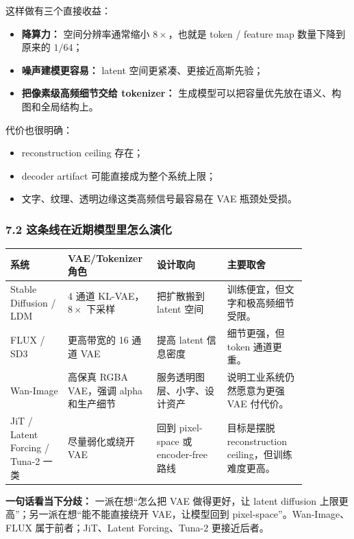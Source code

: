 这样做有三个直接收益：

\begin{itemize}[leftmargin=1.5em]
  \item \textbf{降算力：} 空间分辨率通常缩小 $8\times$，也就是 token / feature map 数量下降到原来的 $1/64$；
  \item \textbf{噪声建模更容易：} latent 空间更紧凑、更接近高斯先验；
  \item \textbf{把像素级高频细节交给 tokenizer：} 生成模型可以把容量优先放在语义、构图和全局结构上。
\end{itemize}

代价也很明确：

\begin{itemize}[leftmargin=1.5em]
  \item reconstruction ceiling 存在；
  \item decoder artifact 可能直接成为整个系统上限；
  \item 文字、纹理、透明边缘这类高频信号最容易在 VAE 瓶颈处受损。
\end{itemize}

\subsubsection{7.2 这条线在近期模型里怎么演化}

\begin{center}
\footnotesize
\setlength{\tabcolsep}{4pt}
\begin{tabular}{p{0.18\linewidth} p{0.21\linewidth} p{0.22\linewidth} p{0.25\linewidth}}
\toprule
\textbf{系统} & \textbf{VAE/Tokenizer 角色} & \textbf{设计取向} & \textbf{主要取舍}\\
\midrule
Stable Diffusion / LDM & 4 通道 KL-VAE，$8\times$ 下采样 & 把扩散搬到 latent 空间 & 训练便宜，但文字和极高频细节受限。\\
FLUX / SD3 & 更高带宽的 16 通道 VAE & 提高 latent 信息密度 & 细节更强，但 token 通道更重。\\
Wan-Image & 高保真 RGBA VAE，强调 alpha 和生产细节 & 服务透明图层、小字、设计资产 & 说明工业系统仍然愿意为更强 VAE 付代价。\\
JiT / Latent Forcing / Tuna-2 一类 & 尽量弱化或绕开 VAE & 回到 pixel-space 或 encoder-free 路线 & 目标是摆脱 reconstruction ceiling，但训练难度更高。\\
\bottomrule
\end{tabular}
\end{center}

\begin{summarybox}
\textbf{一句话看当下分歧：} 一派在想“怎么把 VAE 做得更好，让 latent diffusion 上限更高”；另一派在想“能不能直接绕开 VAE，让模型回到 pixel-space”。Wan-Image、FLUX 属于前者；JiT、Latent Forcing、Tuna-2 更接近后者。
\end{summarybox}

